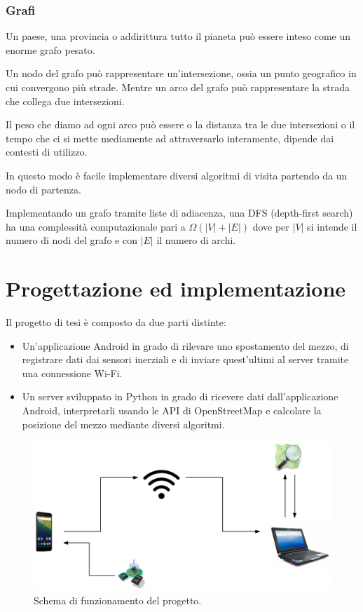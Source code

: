 \documentclass[12pt,a4paper,openright,twoside]{report}
\begin{document}
\subsection{Grafi}
Un paese, una provincia o addirittura tutto il pianeta può essere inteso come un enorme grafo pesato.

Un nodo del grafo può rappresentare un'intersezione, ossia un punto geografico in cui convergono più strade. Mentre un arco del grafo può rappresentare la strada che collega due intersezioni.
 
Il peso che diamo ad ogni arco può essere o la distanza tra le due intersezioni o il tempo che ci si mette mediamente ad attraversarlo interamente, dipende dai contesti di utilizzo.

In questo modo è facile implementare diversi algoritmi di visita partendo da un nodo di partenza.

Implementando un grafo tramite liste di adiacenza, una DFS (depth-first search) ha una complessità computazionale pari a $\Omega(|V| + |E|) $ dove per $\left|V \right|$ si intende il numero di nodi del grafo e con $\left| E \right|$ il numero di archi.

\clearpage{\pagestyle{empty}\cleardoublepage}
\chapter{Progettazione ed implementazione}                %
\lhead[\fancyplain{}{\bfseries\thepage}]{\fancyplain{}{\bfseries\rightmark}}
Il progetto di tesi è composto da due parti distinte:

\begin{itemize}
\item Un'applicazione Android in grado di rilevare uno spostamento del mezzo, di registrare dati dai sensori inerziali e di inviare quest'ultimi al server tramite una connessione Wi-Fi.
\item Un server sviluppato in Python in grado di ricevere dati dall'applicazione Android, interpretarli usando le API di OpenStreetMap e calcolare la posizione del mezzo mediante diversi algoritmi.
\end{itemize}

\begin{figure}[h]
\centering 
\includegraphics[scale=0.4]{fig10} 
\caption{Schema di funzionamento del progetto.} 
\end{figure}
\newpage
\end{document}
